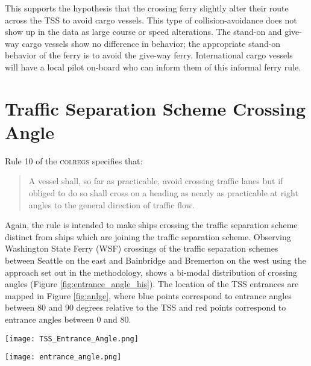 \documentclass[twoside,symmetric,notoc]{tufte-book}
\begin{document}
\par{%
This supports the hypothesis that the crossing ferry slightly alter their route across the TSS to avoid cargo vessels. This type of collision-avoidance does not show up in the data as large course or speed alterations. The stand-on and give-way cargo vessels show no difference in behavior; the appropriate stand-on behavior of the ferry is to avoid the give-way ferry. International cargo vessels will have a local pilot on-board who can inform them of this informal ferry rule.
}
\section{Traffic Separation Scheme Crossing Angle}
\par{
Rule 10 of the \textsc{colregs} specifies that: 
\begin{quotation}
A vessel shall, so far as practicable, avoid crossing traffic lanes but if obliged to do so shall cross on a heading as nearly as practicable at right angles to the general direction of traffic flow. 
\end{quotation}
Again, the rule is intended to make ships crossing the traffic separation scheme distinct from ships which are joining the traffic separation scheme. Observing Washington State Ferry (WSF) crossings of the traffic separation schemes between Seattle on the east and Bainbridge and Bremerton on the west using the approach set out in the methodology, shows a bi-modal distribution of crossing angles (Figure \ref{fig:entrance_angle_his}). The location of the TSS entrances are mapped in Figure \ref{fig:anlge}, where blue points correspond to entrance angles between 80 and 90 degrees relative to the TSS and red points correspond to entrance angles between 0 and 80.
\begin{figure*}
    \centering
    \texttt{[image: TSS\_Entrance\_Angle.png]}
    \caption{Washington State Ferries' relative angle to traffic separation scheme.}
    \label{fig:entrance_angle_his}
\end{figure*}
\begin{figure*}
    \centering
    \texttt{[image: entrance\_angle.png]}
    \caption{Points where a WSF entered a traffic separation scheme.}
    \label{fig:anlge}
    \forceversofloat
\end{figure*}
}
\end{document}
